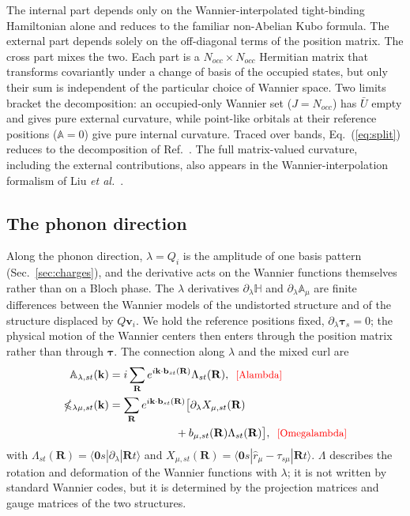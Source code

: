 \documentclass[galley,aps,pra,10pt,amsmath,amssymb,
    superscriptaddress,nofootinbib,longbibliography]{revtex4-2}
\def\Red#1{\textcolor{red}{#1}}
\newcounter{comm}
\newcommand{\seclab}[1]{\label{sec:#1}{\Red{\small\;\;[sec:~#1]}}}
\newcommand{\eqlab}[1]{\Red{\hbox{\small\;\;[#1]}}\label{eq:#1}}
\newcommand{\eqlab}[1]{\label{eq:#1}}
\newcommand{\seclab}[1]{\label{sec:#1}}
\newcommand{\nn}{\nonumber\\}
\newcommand{\eq}[1]{Eq.~(\ref{eq:#1})}
\newcommand{\sref}[1]{Sec.~\ref{sec:#1}}
\newcommand{\Ab}{\mathbb{A}}               %
\newcommand{\Hb}{\mathbb{H}}               %
\newcommand{\Omb}{\mathbb{\Omega}}         %
\begin{document}
The internal part depends only on the Wannier-interpolated tight-binding Hamiltonian alone and reduces to the familiar non-Abelian Kubo formula. The external part depends solely on the off-diagonal terms of the position matrix. The cross part mixes the two. Each part is a $N_{occ} \times N_{occ}$ Hermitian matrix that transforms covariantly under a change of basis of the occupied states, but only their sum is independent of the particular choice of Wannier space. Two limits bracket the decomposition: an occupied-only Wannier set ($J=N_{occ}$) has $\bar{U}$ empty and gives pure external curvature, while point-like orbitals at their reference positions ($\Ab = 0$) give pure internal curvature. Traced over bands, \eq{split} reduces to the decomposition of Ref.~\cite{wang2006abinitio}. The full matrix-valued curvature, including the external contributions, also appears in the Wannier-interpolation formalism of Liu \emph{et al.}~\cite{liu2023covariant}.

\subsection{The phonon direction}
\seclab{phonon-direction}

Along the phonon direction, $\lambda=Q_i$ is the amplitude of one basis pattern (\sref{charges}), and the derivative acts on the Wannier functions themselves rather than on a Bloch phase. The $\lambda$ derivatives $\partial_\lambda\Hb$ and $\partial_\lambda\Ab_\mu$ are finite differences between the Wannier models of the undistorted structure and of the structure displaced by $Q\mathbf v_i$. We hold the reference positions fixed, $\partial_\lambda\boldsymbol\tau_s=0$; the physical motion of the Wannier centers then enters through the position matrix rather than through $\boldsymbol\tau$.
The connection along $\lambda$ and the mixed curl are 
\begin{align}
\Ab_{\lambda,st}(\mathbf k)&=i\sum_{\mathbf R}e^{i\mathbf k\cdot\mathbf b_{st}(\mathbf R)}\Lambda_{st}(\mathbf R),
\eqlab{Alambda}\\
\Omb_{\lambda\mu,st}(\mathbf k)&=\sum_{\mathbf R}e^{i\mathbf k\cdot\mathbf b_{st}(\mathbf R)}\big[\partial_\lambda X_{\mu,st}(\mathbf R)\nn
&\hspace{6em}+b_{\mu,st}(\mathbf R)\Lambda_{st}(\mathbf R)\big],
\eqlab{Omegalambda}
\end{align}
with $\Lambda_{st}(\mathbf R)=\langle\mathbf 0s|\partial_\lambda|\mathbf Rt\rangle$ and $X_{\mu,st}(\mathbf R)=\langle\mathbf 0s|\hat r_\mu-\tau_{s\mu}|\mathbf Rt\rangle$.
$\Lambda$ describes the rotation and deformation of the Wannier functions with $\lambda$; it is not written by standard Wannier codes, but it is determined by the projection matrices and gauge matrices of the two structures.
\end{document}
